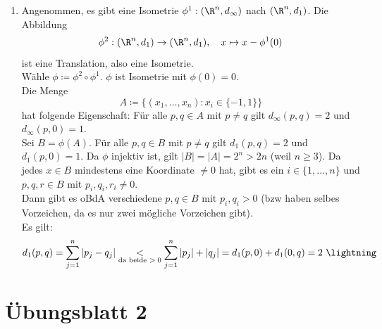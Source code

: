 \begin{solution}
\begin{enumerate}[label=(\alph*)]
    \item Angenommen, es gibt eine Isometrie \( \phi^1: (\R^n, d_\infty) \) nach \( (\R^n, d_1) \). Die Abbildung
    \begin{equation*}
      \phi^2 : (\R^n, d_1) \to (\R^n, d_1), \quad x \mapsto x - \phi^1(0)
    \end{equation*}
    ist eine Translation, also eine Isometrie. \\
    Wähle \( \phi \coloneqq \phi^2 \circ \phi^1 \). \( \phi \) ist Isometrie mit \( \phi(0) = 0 \). \\
    Die Menge
    \begin{equation*}
      A \coloneqq \{ (x_1, \dots, x_n): x_i \in \{ -1, 1 \} \}
    \end{equation*}
    hat folgende Eigenschaft: Für alle \( p, q \in A \) mit \( p \neq q \) gilt \( d_\infty(p,q) = 2 \) und \( d_\infty(p, 0) = 1 \). \\
    Sei \( B = \phi(A) \). Für alle \( p,q \in B \) mit \( p \neq q \) gilt \( d_1(p,q) = 2 \) und \( d_1(p,0) = 1 \). Da \( \phi \) injektiv ist, gilt \( \vert B \vert = \vert A \vert = 2^n > 2n \) (weil \( n \geq 3 \)). Da jedes \( x \in B \) mindestens eine Koordinate \( \neq 0 \) hat, gibt es ein \( i \in \{ 1, \dots, n \} \) und \( p,q,r \in B \) mit \( p_i, q_i, r_i \neq 0 \). \\
    Dann gibt es oBdA verschiedene \( p,q \in B \) mit \( p_i, q_i > 0 \) (bzw haben selbes Vorzeichen, da es nur zwei mögliche Vorzeichen gibt). \\
    Es gilt:
    \begin{equation*}
      d_1(p,q) = \sum_{j = 1}^n \vert p_j - q_j \vert \underset{\text{da beide \( > 0 \)}}{<} \sum_{j = 1}^n \vert p_j \vert + \vert q_j \vert = d_1(p,0) + d_1(0,q) = 2 \ \lightning
    \end{equation*}
  \end{enumerate}
\end{solution}



% 
\section{Übungsblatt 2}

